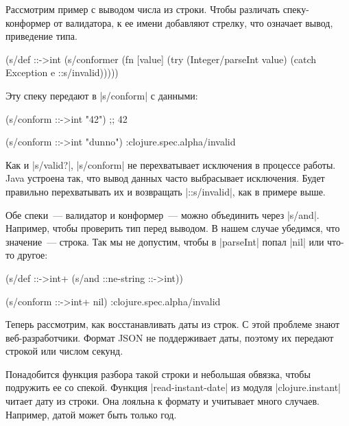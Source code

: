 Рассмотрим пример с выводом числа из строки. Чтобы различать спеку-конформер от
валидатора, к ее имени добавляют стрелку, что означает вывод, приведение типа.

\begin{english}
  \begin{clojure}
(s/def ::->int
  (s/conformer
   (fn [value]
     (try
       (Integer/parseInt value)
       (catch Exception e
         ::s/invalid)))))
  \end{clojure}
\end{english}

Эту спеку передают в \spverb|s/conform| с данными:

\begin{english}
  \begin{clojure}
(s/conform ::->int "42") ;; 42

(s/conform ::->int "dunno")
:clojure.spec.alpha/invalid
  \end{clojure}
\end{english}

Как и \spverb|s/valid?|, \spverb|s/conform| не перехватывает исключения в
процессе работы. Java устроена так, что вывод данных часто выбрасывает
исключения. Будет правильно перехватывать их и возвращать \spverb|::s/invalid|,
как в примере выше.

Обе спеки~--- валидатор и конформер~--- можно объединить через
\spverb|s/and|. Например, чтобы проверить тип перед выводом. В нашем случае
убедимся, что значение~--- строка. Так мы не допустим, чтобы в \spverb|parseInt|
попал \spverb|nil| или что-то другое:

\begin{english}
  \begin{clojure}
(s/def ::->int+
  (s/and ::ne-string ::->int))

(s/conform ::->int+ nil)
:clojure.spec.alpha/invalid
  \end{clojure}
\end{english}

Теперь рассмотрим, как восстанавливать даты из строк. С этой проблеме знают %
веб-разработчики. Формат JSON не поддерживает даты, поэтому их передают строкой
или числом секунд.

Понадобится функция разбора такой строки и небольшая обвязка, чтобы подружить ее
со спекой. Функция \spverb|read-instant-date| из модуля \spverb|clojure.instant|
читает дату из строки. Она лояльна к формату и учитывает много
случаев. Например, датой может быть только год.

